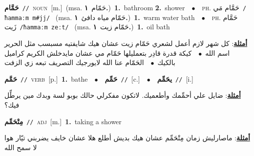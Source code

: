 \documentclass[10pt,a4paper,twoside]{article} %
\begin{document}
\begin{multicols}{2}
{\setlength\topsep{0pt}\textbf{\foreignlanguage{arabic}{حَمَّام}}\ {\color{gray}\texttt{//}\color{black}}\ \textsc{noun}\ [m.]\ \color{gray}(msa. \foreignlanguage{arabic}{حَمّام}~\foreignlanguage{arabic}{\textbf{١.}})\color{black}\ \textbf{1.}~bathroom  \textbf{2.}~shower\ \ $\bullet$\ \ \textsc{ph.} \color{gray} \foreignlanguage{arabic}{حَمَّام مَي}\color{black}\ {\color{gray}\texttt{/{\sffamily ħammaːm m\#jj}/}\color{black}}\ \color{gray} (msa. \foreignlanguage{arabic}{حَمّام مياه دافئ}~\foreignlanguage{arabic}{\textbf{١.}})\color{black}\ \textbf{1.}~warm water bath\ \ $\bullet$\ \ \textsc{ph.} \color{gray} \foreignlanguage{arabic}{حَمَّام زَيت}\color{black}\ {\color{gray}\texttt{/{\sffamily ħammaːm zeːt}/}\color{black}}\ \color{gray} (msa. \foreignlanguage{arabic}{حَمّام زيت}~\foreignlanguage{arabic}{\textbf{١.}})\color{black}\ \textbf{1.}~oil bath\  \begin{flushright}\color{gray}\foreignlanguage{arabic}{\textbf{\underline{\foreignlanguage{arabic}{أمثلة}}}: كل شهر لازم أعمل لشعري حَمّام زيت عشان هيك شايفتيه مسبسب مثل الحرير اسم الله\ $\bullet$\ \  كيكة قدرة قادِر بتعمليلها حَمّام مي عشان مايدخلش الكريم كراميل بالكيك\ $\bullet$\ \  الحَمّام عنا الله لايورجيك التصريف تبعه زي الزفت}\end{flushright}\color{black}} \vspace{2mm}

{\setlength\topsep{0pt}\textbf{\foreignlanguage{arabic}{حَمَّم}}\ {\color{gray}\texttt{//}\color{black}}\ \textsc{verb}\ [p.]\ \textbf{1.}~bathe\ \ $\bullet$\ \ \setlength\topsep{0pt}\textbf{\foreignlanguage{arabic}{حَمِّم}}\ {\color{gray}\texttt{//}\color{black}}\ [c.]\ \ $\bullet$\ \ \setlength\topsep{0pt}\textbf{\foreignlanguage{arabic}{يحَمِّم}}\ {\color{gray}\texttt{//}\color{black}}\ [i.]\  \begin{flushright}\color{gray}\foreignlanguage{arabic}{\textbf{\underline{\foreignlanguage{arabic}{أمثلة}}}: ضايل علي أحمِّمك وأطعميك. لاتكون مفكرلي حالك بوبو لسة وبدك مين يرطِّل فيك؟}\end{flushright}\color{black}} \vspace{2mm}

{\setlength\topsep{0pt}\textbf{\foreignlanguage{arabic}{مِتْحَمِّم}}\ {\color{gray}\texttt{//}\color{black}}\ \textsc{adj}\ [m.]\ \textbf{1.}~taking a shower\  \begin{flushright}\color{gray}\foreignlanguage{arabic}{\textbf{\underline{\foreignlanguage{arabic}{أمثلة}}}: ماصارليش زمان مِتْحَمِّم عشان هيك بديش أطلع هلا عشان خايف يضربني تيّار هوا لا سمح الله}\end{flushright}\color{black}} \vspace{2mm}


\end{multicols}
\end{document}
